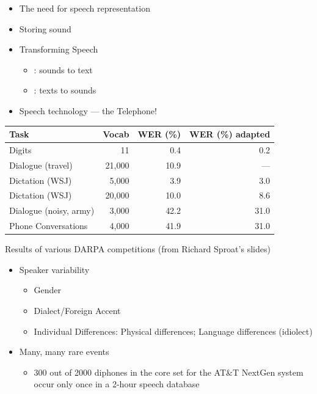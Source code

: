 \documentclass[a4paper,landscape,headrule,footrule,xetex]{foils}
\begin{document}


\maketitle






\begin{itemize}
\item The need for speech representation
\item Storing sound
\item Transforming Speech
  \begin{itemize}
  \item {}: sounds to text
  \item {}: texts to sounds
  \end{itemize}
\item Speech technology --- the Telephone!
\end{itemize}



  \begin{tabular}{lrrr}
    Task & Vocab & WER (\%) & WER  (\%) adapted \\ \hline
    Digits & 11 & 0.4 & 0.2 \\
    Dialogue (travel) & 21,000 & 10.9 & --- \\
    Dictation (WSJ) & 5,000 & 3.9 & 3.0 \\
    Dictation (WSJ) & 20,000 & 10.0 & 8.6 \\
    Dialogue (noisy, army) & 3,000 & 42.2 & 31.0 \\
    Phone Conversations & 4,000 & 41.9 & 31.0 \\
  \end{tabular}

Results of various DARPA competitions (from Richard Sproat's slides)

\begin{itemize}
\item Speaker variability
  \begin{itemize}
  \item Gender
  \item Dialect/Foreign Accent
  \item Individual Differences: Physical differences; Language differences (idiolect)‏
  \end{itemize}
\item Many, many rare events
  \begin{itemize}
  \item 300 out of 2000 diphones in the core set for the AT\&T NextGen system occur only once in a 2-hour speech database
  \end{itemize}
\end{itemize}
\end{document}
